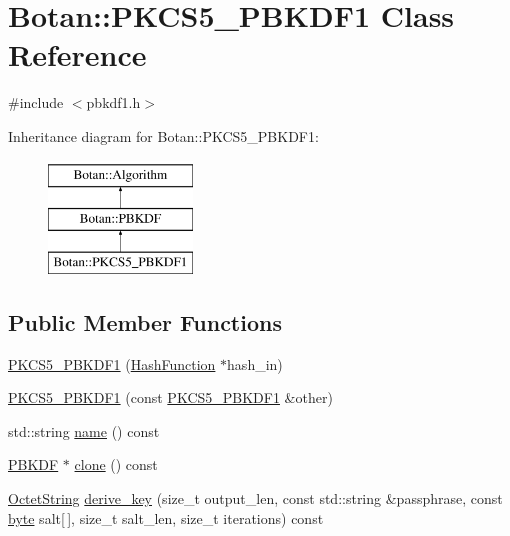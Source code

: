 \hypertarget{classBotan_1_1PKCS5__PBKDF1}{\section{Botan\-:\-:P\-K\-C\-S5\-\_\-\-P\-B\-K\-D\-F1 Class Reference}
\label{classBotan_1_1PKCS5__PBKDF1}
}


{\ttfamily \#include $<$pbkdf1.\-h$>$}

Inheritance diagram for Botan\-:\-:P\-K\-C\-S5\-\_\-\-P\-B\-K\-D\-F1\-:\begin{figure}[H]
\begin{center}
\leavevmode
\includegraphics[height=3.000000cm]{classBotan_1_1PKCS5__PBKDF1}
\end{center}
\end{figure}
\subsection*{Public Member Functions}
\begin{DoxyCompactItemize}
\item 
\hyperlink{classBotan_1_1PKCS5__PBKDF1_ae34a989275160e52d048a20a42c784dd}{P\-K\-C\-S5\-\_\-\-P\-B\-K\-D\-F1} (\hyperlink{classBotan_1_1HashFunction}{Hash\-Function} $\ast$hash\-\_\-in)
\item 
\hyperlink{classBotan_1_1PKCS5__PBKDF1_ab06055d9bb68963a7e98ce47ca0129d3}{P\-K\-C\-S5\-\_\-\-P\-B\-K\-D\-F1} (const \hyperlink{classBotan_1_1PKCS5__PBKDF1}{P\-K\-C\-S5\-\_\-\-P\-B\-K\-D\-F1} \&other)
\item 
std\-::string \hyperlink{classBotan_1_1PKCS5__PBKDF1_a39665d57c2d1aac64955fdb64729e21b}{name} () const 
\item 
\hyperlink{classBotan_1_1PBKDF}{P\-B\-K\-D\-F} $\ast$ \hyperlink{classBotan_1_1PKCS5__PBKDF1_aeec6e1a5f68632db39c6c6413fd61b06}{clone} () const 
\item 
\hyperlink{classBotan_1_1OctetString}{Octet\-String} \hyperlink{classBotan_1_1PKCS5__PBKDF1_a9a0a0cbf678d04514c5b7b6d15479c8e}{derive\-\_\-key} (size\-\_\-t output\-\_\-len, const std\-::string \&passphrase, const \hyperlink{namespaceBotan_a7d793989d801281df48c6b19616b8b84}{byte} salt\mbox{[}$\,$\mbox{]}, size\-\_\-t salt\-\_\-len, size\-\_\-t iterations) const 
\end{DoxyCompactItemize}


